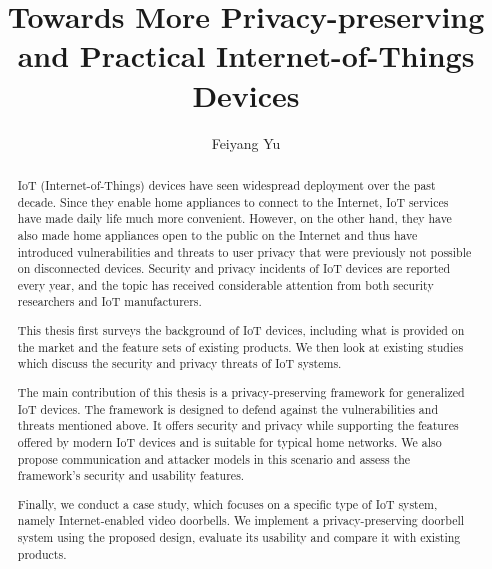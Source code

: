 \documentclass[12pt]{report}
\title{Towards More Privacy-preserving and Practical Internet-of-Things Devices}
\author{Feiyang Yu}
\begin{document}

\maketitle    %

\begin{abstract}

IoT (Internet-of-Things) devices have seen widespread deployment over the past decade. Since they enable home appliances to connect to the Internet, IoT services have made daily life much more convenient. However, on the other hand, they have also made home appliances open to the public on the Internet and thus have introduced vulnerabilities and threats to user privacy that were previously not possible on disconnected devices. Security and privacy incidents of IoT devices are reported every year, and the topic has received considerable attention from both security researchers and IoT manufacturers.

This thesis first surveys the background of IoT devices, including what is provided on the market and the feature sets of existing products. We then look at existing studies which discuss the security and privacy threats of IoT systems.

The main contribution of this thesis is a privacy-preserving framework for generalized IoT devices. The framework is designed to defend against the vulnerabilities and threats mentioned above. It offers security and privacy while supporting the features offered by modern IoT devices and is suitable for typical home networks. We also propose communication and attacker models in this scenario and assess the framework's security and usability features.

Finally, we conduct a case study, which focuses on a specific type of IoT system, namely Internet-enabled video doorbells. We implement a privacy-preserving doorbell system using the proposed design, evaluate its usability and compare it with existing products.

\end{abstract}





\end{document}
